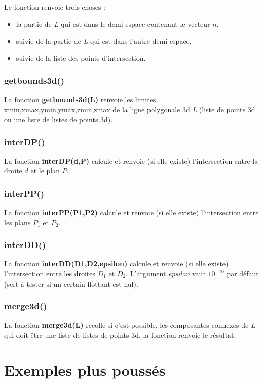 \documentclass[%
10pt,%
a4paper,%
french,%
]%
{article}%
\begin{document}
Le fonction renvoie trois choses :
\begin{itemize}
    \item la partie de \emph{L} qui est dans le demi-espace contenant le vecteur $n$,
    \item suivie de la partie de \emph{L} qui est dans l'autre demi-espace,
    \item suivie de la liste des points d'intersection.
\end{itemize}

\subsubsection{getbounds3d()}
La fonction \textbf{getbounds3d(L)} renvoie les limites xmin,xmax,ymin,ymax,zmin,zmax de la ligne polygonale 3d \emph{L} (liste de points 3d ou une liste de listes de points 3d).

\subsubsection{interDP()}
La fonction \textbf{interDP(d,P)} calcule et renvoie (si elle existe) l'intersection entre la droite $d$ et le plan $P$.

\subsubsection{interPP()}
La fonction \textbf{interPP(P1,P2)} calcule et renvoie (si elle existe) l'intersection entre les plans $P_1$ et $P_2$.

\subsubsection{interDD()}
La fonction \textbf{interDD(D1,D2,epsilon)} calcule et renvoie (si elle existe) l'intersection entre les droites $D_1$ et $D_2$. L'argument \emph{epsilon} vaut $10^{-10}$ par défaut (sert à tester si un certain flottant est nul).

\subsubsection{merge3d()}
La fonction \textbf{merge3d(L)} recolle si c'est possible, les composantes connexes de \emph{L} qui doit être une liste de listes de points 3d, la fonction renvoie le résultat.

\section{Exemples plus poussés}
\end{document}
